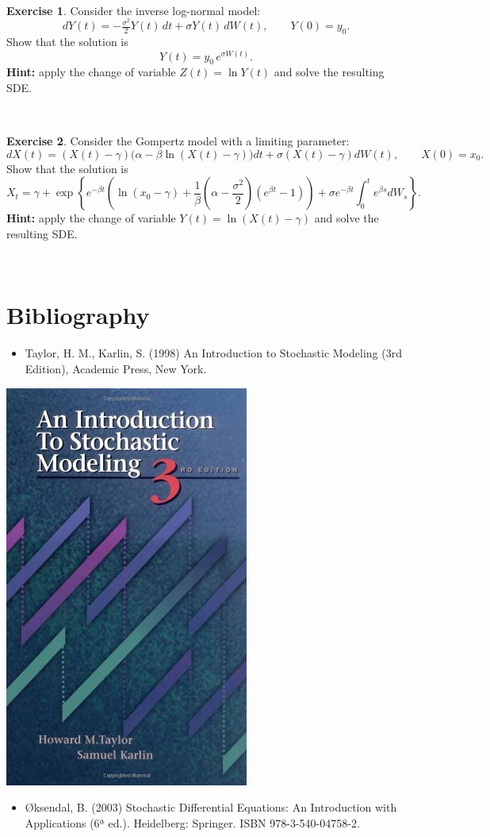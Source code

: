 \documentclass[
  11pt,
  a4paper,
]{book}
\providecommand{\tightlist}{%
  \setlength{\itemsep}{0pt}\setlength{\parskip}{0pt}}
\theoremstyle{definition}
\theoremstyle{definition}
\theoremstyle{definition}
\newtheorem{exercise}{Exercise}[chapter]
\theoremstyle{definition}
\theoremstyle{remark}
\begin{document}
\(\,\)

\begin{exercise}
Consider the inverse log-normal model:
\[
dY(t) = -\tfrac{\sigma^2}{2} Y(t)\,dt + \sigma Y(t)\,dW(t), \qquad Y(0)=y_0.
\]
Show that the solution is
\[
Y(t) = y_0\,e^{\sigma W(t)}.
\]
\textbf{Hint:} apply the change of variable \(Z(t) = \ln Y(t)\) and solve the resulting SDE.
\end{exercise}

\(\,\)

\begin{exercise}
Consider the Gompertz model with a limiting parameter:
\[
dX(t)=(X(t)-\gamma)\big(\alpha - \beta\ln(X(t)-\gamma)\big)dt + \sigma (X(t)-\gamma)dW(t), \qquad X(0)=x_0.
\]
Show that the solution is
\[
X_t=\gamma+\exp\left\{e^{-\beta t}\left(\ln(x_0-\gamma)+\frac{1}{\beta}\left(\alpha-\frac{\sigma^2}{2}\right)(e^{\beta t}-1)\right)+\sigma e^{-\beta t}\int_{0}^{t}{e^{\beta s}}dW_s\right\}.
\]
\textbf{Hint:} apply the change of variable \(Y(t)=\ln(X(t)-\gamma)\) and solve the resulting SDE.
\end{exercise}

\(\,\)

\chapter{Bibliography}\label{bibliography}

\begin{itemize}
\tightlist
\item
  Taylor, H. M., Karlin, S. (1998) An Introduction to Stochastic Modeling (3rd Edition), Academic Press, New York.
\end{itemize}

\begin{center}\includegraphics[width=0.25\linewidth]{figures/book2} \end{center}

\begin{itemize}
\tightlist
\item
  Øksendal, B. (2003) Stochastic Differential Equations: An Introduction with Applications (6ª ed.). Heidelberg: Springer. ISBN 978-3-540-04758-2.
\end{itemize}
\end{document}

